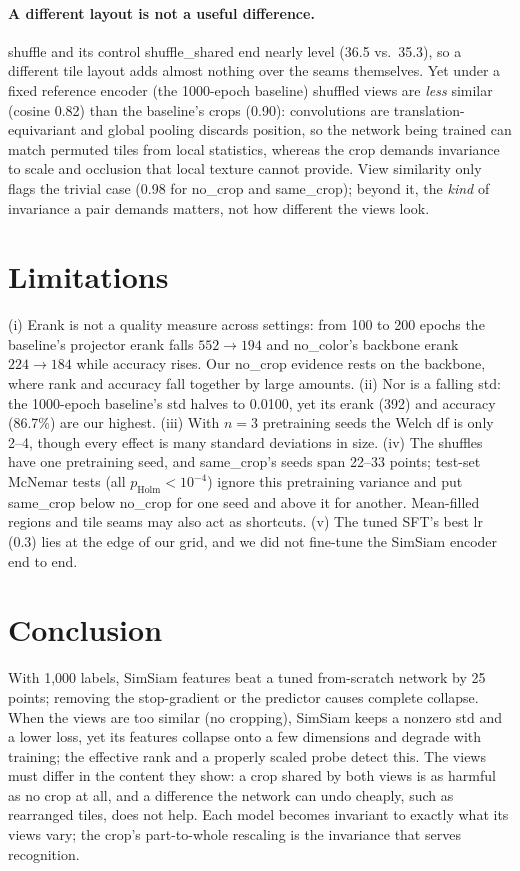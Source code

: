 \documentclass[10pt,twocolumn,letterpaper]{article}
\begin{document}
\paragraph{A different layout is not a useful difference.}
shuffle and its control shuffle\_shared end nearly level (36.5 vs.\ 35.3), so a different tile layout adds almost nothing over the seams themselves.
Yet under a fixed reference encoder (the 1000-epoch baseline) shuffled views are \emph{less} similar (cosine 0.82) than the baseline's crops (0.90): convolutions are translation-equivariant and global pooling discards position, so the network being trained can match permuted tiles from local statistics, whereas the crop demands invariance to scale and occlusion that local texture cannot provide.
View similarity only flags the trivial case (0.98 for no\_crop and same\_crop); beyond it, the \emph{kind} of invariance a pair demands matters, not how different the views look.


\section{Limitations}
\label{sec:limitations}

(i) Erank is not a quality measure across settings: from 100 to 200 epochs the baseline's projector erank falls $552\to194$ and no\_color's backbone erank $224\to184$ while accuracy rises. Our no\_crop evidence rests on the backbone, where rank and accuracy fall together by large amounts.
(ii) Nor is a falling std: the 1000-epoch baseline's std halves to 0.0100, yet its erank (392) and accuracy (86.7\%) are our highest.
(iii) With $n{=}3$ pretraining seeds the Welch df is only 2--4, though every effect is many standard deviations in size.
(iv) The shuffles have one pretraining seed, and same\_crop's seeds span 22--33 points; test-set McNemar tests (all $p_\text{Holm}<10^{-4}$) ignore this pretraining variance and put same\_crop below no\_crop for one seed and above it for another. Mean-filled regions and tile seams may also act as shortcuts.
(v) The tuned SFT's best lr (0.3) lies at the edge of our grid, and we did not fine-tune the SimSiam encoder end to end.

\section{Conclusion}
\label{sec:conclusion}
With 1,000 labels, SimSiam features beat a tuned from-scratch network by 25 points; removing the stop-gradient or the predictor causes complete collapse.
When the views are too similar (no cropping), SimSiam keeps a nonzero std and a lower loss, yet its features collapse onto a few dimensions and degrade with training; the effective rank and a properly scaled probe detect this.
The views must differ in the content they show: a crop shared by both views is as harmful as no crop at all, and a difference the network can undo cheaply, such as rearranged tiles, does not help. Each model becomes invariant to exactly what its views vary; the crop's part-to-whole rescaling is the invariance that serves recognition.

{
    \small
    
    
}
\end{document}

